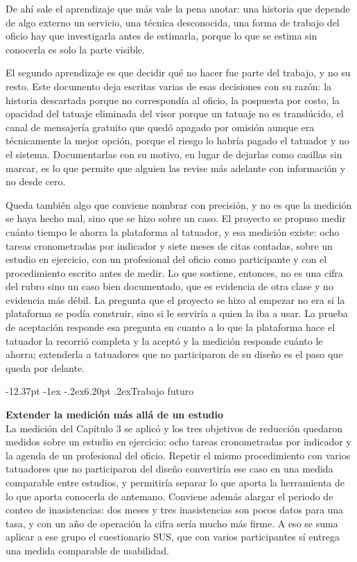 \documentclass[12pt,letterpaper,oneside]{report}
\makeatletter
\renewcommand\section{\@startsection{section}{1}{\z@}%
  {-12.37pt \@plus -1ex \@minus -.2ex}{6.20pt \@plus.2ex}{\normalfont\large\bfseries}}
\newcommand{\tituloparpegado}[1]{\par\textbf{#1}\\\indent\ignorespaces}
\makeatother
\begin{document}
De ahí sale el aprendizaje que más vale la pena anotar: una historia que depende de algo externo un servicio, una técnica desconocida, una forma de trabajo del oficio hay que investigarla antes de estimarla, porque lo que se estima sin conocerla es solo la parte visible.

El segundo aprendizaje es que decidir qué no hacer fue parte del trabajo, y no su resto. Este documento deja escritas varias de esas decisiones con su razón: la historia descartada porque no correspondía al oficio, la pospuesta por costo, la opacidad del tatuaje eliminada del visor porque un tatuaje no es translúcido, el canal de mensajería gratuito que quedó apagado por omisión aunque era técnicamente la mejor opción, porque el riesgo lo habría pagado el tatuador y no el sistema. Documentarlas con su motivo, en lugar de dejarlas como casillas sin marcar, es lo que permite que alguien las revise más adelante con información y no desde cero.



Queda también algo que conviene nombrar con precisión, y no es que la medición se haya hecho mal, sino que se hizo sobre un caso. El proyecto se propuso medir cuánto tiempo le ahorra la plataforma al tatuador, y esa medición existe: ocho tareas cronometradas por indicador y siete meses de citas contadas, sobre un estudio en ejercicio, con un profesional del oficio como participante y con el procedimiento escrito antes de medir. Lo que sostiene, entonces, no es una cifra del rubro sino un caso bien documentado, que es evidencia de otra clase y no evidencia más débil. La pregunta que el proyecto se hizo al empezar no era si la plataforma se podía construir, sino si le serviría a quien la iba a usar. La prueba de aceptación responde esa pregunta en cuanto a lo que la plataforma hace el tatuador la recorrió completa y la aceptó y la medición responde cuánto le ahorra; extenderla a tatuadores que no participaron de su diseño es el paso que queda por delante.

\section{Trabajo futuro}

\tituloparpegado{Extender la medición más allá de un estudio}
La medición del Capítulo 3 se aplicó y los tres objetivos de reducción quedaron medidos sobre un estudio en ejercicio: ocho tareas cronometradas por indicador y la agenda de un profesional del oficio. Repetir el mismo procedimiento con varios tatuadores que no participaron del diseño convertiría ese caso en una medida comparable entre estudios, y permitiría separar lo que aporta la herramienta de lo que aporta conocerla de antemano. Conviene además alargar el periodo de conteo de inasistencias: dos meses y tres inasistencias son pocos datos para una tasa, y con un año de operación la cifra sería mucho más firme. A eso se suma aplicar a ese grupo el cuestionario SUS, que con varios participantes sí entrega una medida comparable de usabilidad.
\end{document}
